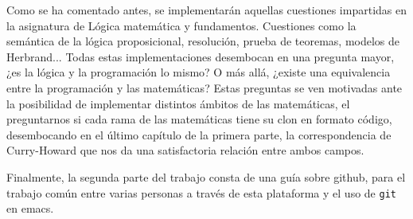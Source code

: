 Como se ha comentado antes, se implementarán aquellas cuestiones impartidas en la asignatura de Lógica matemática y fundamentos. Cuestiones como la semántica de la lógica proposicional, resolución, prueba de teoremas, modelos de Herbrand... Todas estas implementaciones desembocan en una pregunta mayor, ¿es la lógica y la programación lo mismo? O más allá, ¿existe una equivalencia entre la programación y las matemáticas? Estas preguntas se ven motivadas ante la posibilidad de implementar distintos ámbitos de las matemáticas, el preguntarnos si cada rama de las matemáticas tiene su clon en formato código, desembocando en el último capítulo de la primera parte, la correspondencia de Curry-Howard que nos da una satisfactoria relación entre ambos campos.

Finalmente, la segunda parte del trabajo consta de una guía sobre github, para el trabajo común entre varias personas a través de esta plataforma y el uso de \texttt{git} en emacs. 


